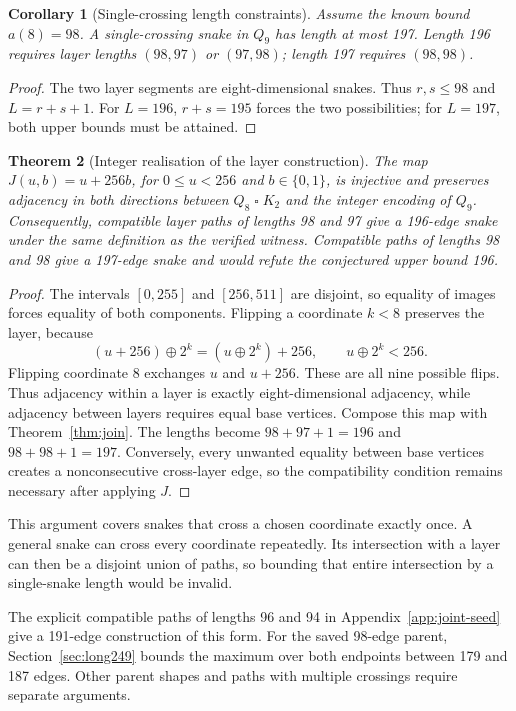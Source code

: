 \documentclass[11pt,a4paper]{article}
\newtheorem{theorem}{Theorem}[section]
\newtheorem{corollary}[theorem]{Corollary}
\theoremstyle{definition}
\theoremstyle{remark}
\newcommand{\Q}{Q}
\begin{document}
\begin{corollary}[Single-crossing length constraints]
Assume the known bound $a(8)=98$. A single-crossing snake in $\Q_9$ has length at most 197. Length 196 requires layer lengths $(98,97)$ or $(97,98)$; length 197 requires $(98,98)$.
\end{corollary}
\begin{proof}
The two layer segments are eight-dimensional snakes. Thus $r,s\le98$ and $L=r+s+1$. For $L=196$, $r+s=195$ forces the two possibilities; for $L=197$, both upper bounds must be attained.
\end{proof}
\begin{theorem}[Integer realisation of the layer construction]
The map $J(u,b)=u+256b$, for $0\le u<256$ and $b\in\{0,1\}$, is injective and preserves adjacency in both directions between $\Q_8\mathbin{\square}K_2$ and the integer encoding of $\Q_9$. Consequently, compatible layer paths of lengths 98 and 97 give a 196-edge snake under the same definition as the verified witness. Compatible paths of lengths 98 and 98 give a 197-edge snake and would refute the conjectured upper bound 196.
\end{theorem}
\begin{proof}
The intervals $[0,255]$ and $[256,511]$ are disjoint, so equality of images forces equality of both components. Flipping a coordinate $k<8$ preserves the layer, because
\[
(u+256)\mathbin{\oplus}2^k=(u\mathbin{\oplus}2^k)+256,
\qquad u\mathbin{\oplus}2^k<256.
\]
Flipping coordinate 8 exchanges $u$ and $u+256$. These are all nine possible flips. Thus adjacency within a layer is exactly eight-dimensional adjacency, while adjacency between layers requires equal base vertices. Compose this map with Theorem~\ref{thm:join}. The lengths become $98+97+1=196$ and $98+98+1=197$. Conversely, every unwanted equality between base vertices creates a nonconsecutive cross-layer edge, so the compatibility condition remains necessary after applying $J$.
\end{proof}
This argument covers snakes that cross a chosen coordinate exactly once. A general snake can cross every coordinate repeatedly. Its intersection with a layer can then be a disjoint union of paths, so bounding that entire intersection by a single-snake length would be invalid.

The explicit compatible paths of lengths 96 and 94 in Appendix~\ref{app:joint-seed} give a 191-edge construction of this form. For the saved 98-edge parent, Section~\ref{sec:long249} bounds the maximum over both endpoints between 179 and 187 edges. Other parent shapes and paths with multiple crossings require separate arguments.
\end{document}
